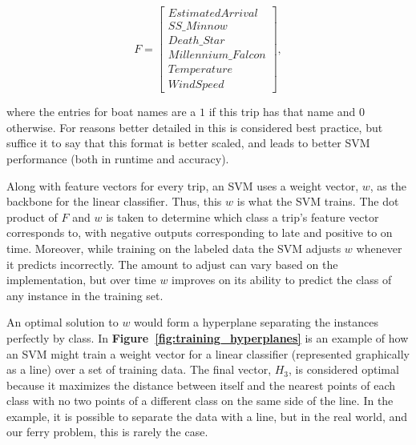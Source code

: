 \documentclass[11pt]{article} %
\begin{document}
\[F=\begin{bmatrix}
        EstimatedArrival \\
        SS\_Minnow\\
        Death\_Star\\
        Millennium\_Falcon\\
        Temperature\\
        WindSpeed
\end{bmatrix},\]

where the entries for boat names are a $1$ if this trip has that name and $0$
otherwise. For reasons better detailed in \cite{chang2011libsvm} this is considered 
best practice, but suffice it to say that this format is better scaled, and 
leads to better SVM performance (both in runtime and accuracy).

Along with feature vectors for every trip, an SVM uses a weight vector, $w$,
as the backbone for the linear classifier. Thus, this $w$ is what the
SVM trains. The dot product of $F$ and $w$ is taken to determine which class a 
trip's feature vector corresponds to, with negative outputs corresponding to 
late and positive to on time. Moreover, while training on the labeled data
the SVM adjusts $w$ whenever it predicts incorrectly.  The amount to adjust
can vary based on the implementation, but over time $w$ improves on its ability
to predict the class of any instance in the training set.

An optimal solution to $w$ would form a hyperplane separating the instances
perfectly by class. In \textbf{Figure~\ref{fig:training_hyperplanes}} is an 
example of how an SVM might train a weight vector for a linear classifier 
(represented graphically as
a line) over a set of training data. The final vector, $H_3$, is considered 
optimal because it maximizes the distance between itself and the nearest points
of each class with no two points of a different class on the same side of the 
line. In the example, it is possible to separate the data with a 
line, but in the real world, and our ferry problem, this is rarely the case.
\end{document}
